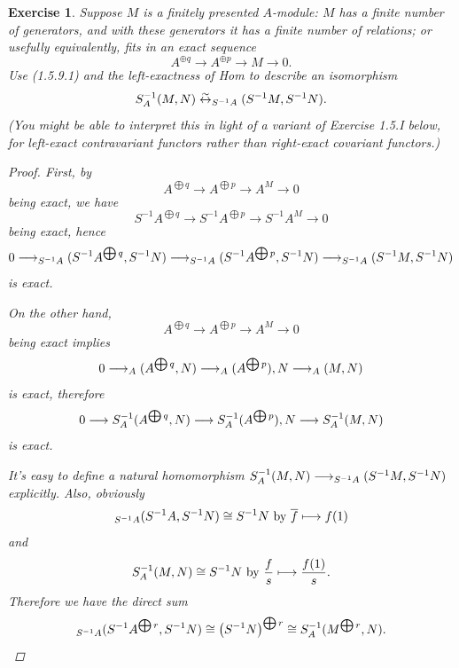 \documentclass{article}
\theoremstyle{breakstyle}
\newtheorem{exercise}{Exercise}[section]
\let\hom\relax
\DeclareMathOperator{\hom}{Hom}
\begin{document}
\begin{exercise}
Suppose $M$ is a finitely presented $A$-module: $M$ has a finite number of
generators, and with these generators it has a finite number of relations;
or usefully equivalently, fits in an exact sequence
$$
A^{\oplus q} \longrightarrow A^{\oplus p} \longrightarrow M \longrightarrow
0.
$$
Use (1.5.9.1) and the left-exactness of Hom to describe an isomorphism
$$
S^{-1}\hom_{A}(M, N) \stackrel{\sim}{\leftrightarrow}
\hom_{S^{-1}A}(S^{-1}M,
S^{-1}N).
$$
(You might be able to interpret this in light of a variant of Exercise
1.5.I below, for left-exact contravariant functors rather than right-exact
covariant functors.)

\begin{proof}
    First, by
    $$
    A^{\bigoplus q}\longrightarrow A^{\bigoplus p}\longrightarrow
    A^{M}\longrightarrow 0  
    $$
    being exact, we have
    $$
    S^{-1}A^{\bigoplus q}\longrightarrow S^{-1}A^{\bigoplus p}\longrightarrow
    S^{-1}A^{M}\longrightarrow 0  
    $$
    being exact, hence
    $$
    0\longrightarrow \hom_{S^{-1}A}{(S^{-1}A^{\bigoplus
    q},S^{-1}N)}\longrightarrow \hom_{S^{-1}A}{(S^{-1}A^{\bigoplus
    p},S^{-1}N)}\longrightarrow \hom_{S^{-1}A}{(S^{-1}M,S^{-1}N)}
    $$
    is exact.

    On the other hand, 
    $$
    A^{\bigoplus q}\longrightarrow A^{\bigoplus p}\longrightarrow
    A^{M}\longrightarrow 0  
    $$
    being exact implies
    $$
    0\longrightarrow \hom_{A}{(A^{\bigoplus q},N)}\longrightarrow
    \hom_{A}{(A^{\bigoplus p}),N}\longrightarrow \hom_{A}{(M,N)}
    $$
    is exact, therefore
    $$ 0\longrightarrow S^{-1}\hom_{A}{(A^{\bigoplus q},N)}\longrightarrow
    S^{-1}\hom_{A}{(A^{\bigoplus p}),N}\longrightarrow S^{-1}\hom_{A}{(M,N)}
    $$
    is exact.

    It's easy to define a natural homomorphism
    $S^{-1}\hom_{A}{(M,N)}\longrightarrow \hom_{S^{-1}A}{(S^{-1}M,S^{-1}N)}$
    explicitly. Also, obviously
    $$
    \hom_{S^{-1}A}{(S^{-1}A,S^{-1}N)}\cong S^{-1}N\text{ by
    }\overline{f}\longmapsto f(1)
    $$
    and
    $$
    S^{-1}\hom_{A}{(M,N)}\cong S^{-1}N\text{ by }\frac{f}{s}\longmapsto
    \frac{f(1)}{s}
    .$$
    Therefore we have the direct sum
    $$
    \hom_{S^{-1}A}{(S^{-1}A^{\bigoplus{r}},S^{-1}N)}\cong 
    \left( S^{-1}N \right) ^{\bigoplus{r}}\cong 
    S^{-1}\hom_{A}{(M^{\bigoplus{r}},N)}
    .$$
\end{proof}

\end{exercise}
\end{document}
